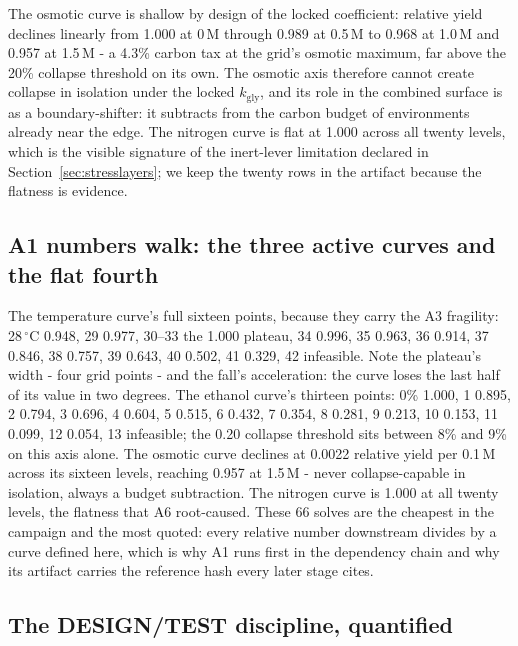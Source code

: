 \documentclass[12pt]{article}
\begin{document}
The osmotic curve is shallow by design of the locked coefficient:
relative yield declines linearly from 1.000 at 0\,M through 0.989 at
0.5\,M to 0.968 at 1.0\,M and 0.957 at 1.5\,M - a 4.3\% carbon tax at
the grid's osmotic maximum, far above the 20\% collapse threshold on
its own. The osmotic axis therefore cannot create collapse in
isolation under the locked $k_{\mathrm{gly}}$, and its role in the
combined surface is as a boundary-shifter: it subtracts from the
carbon budget of environments already near the edge. The nitrogen
curve is flat at 1.000 across all twenty levels, which is the visible
signature of the inert-lever limitation declared in
Section~\ref{sec:stresslayers}; we keep the twenty rows in the
artifact because the flatness is evidence.


\subsection{A1 numbers walk: the three active curves and the flat fourth}

The temperature curve's full sixteen points, because they carry the
A3 fragility: 28\,$^{\circ}$C 0.948, 29 0.977, 30--33 the 1.000
plateau, 34 0.996, 35 0.963, 36 0.914, 37 0.846, 38 0.757, 39 0.643,
40 0.502, 41 0.329, 42 infeasible. Note the plateau's width - four
grid points - and the fall's acceleration: the curve loses the last
half of its value in two degrees. The ethanol curve's thirteen
points: 0\% 1.000, 1 0.895, 2 0.794, 3 0.696, 4 0.604, 5 0.515, 6
0.432, 7 0.354, 8 0.281, 9 0.213, 10 0.153, 11 0.099, 12 0.054, 13
infeasible; the 0.20 collapse threshold sits between 8\% and 9\% on
this axis alone. The osmotic curve declines at 0.0022 relative yield
per 0.1\,M across its sixteen levels, reaching 0.957 at 1.5\,M -
never collapse-capable in isolation, always a budget subtraction.
The nitrogen curve is 1.000 at all twenty levels, the flatness that
A6 root-caused. These 66 solves are the cheapest in the campaign and
the most quoted: every relative number downstream divides by a curve
defined here, which is why A1 runs first in the dependency chain and
why its artifact carries the reference hash every later stage cites.

\subsection{The DESIGN/TEST discipline, quantified}
\end{document}
